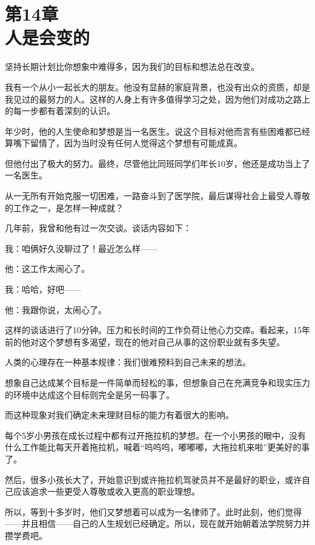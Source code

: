 
\section[第14章\q 人是会变的]{第14章\\ 人是会变的}

{\kaishu

坚持长期计划比你想象中难得多，因为我们的目标和想法总在改变。

}

我有一个从小一起长大的朋友。他没有显赫的家庭背景，也没有出众的资质，却是我见过的最努力的人。这样的人身上有许多值得学习之处，因为他们对成功之路上的每一步都有着深刻的认识。

年少时，他的人生使命和梦想是当一名医生。说这个目标对他而言有些困难都已经算嘴下留情了，因为当时没有任何人觉得这个梦想有可能成真。

但他付出了极大的努力。最终，尽管他比同班同学们年长10岁，他还是成功当上了一名医生。

从一无所有开始克服一切困难，一路奋斗到了医学院，最后谋得社会上最受人尊敬的工作之一，是怎样一种成就？

几年前，我曾和他有过一次交谈。谈话内容如下：

{\kaishu

我：咱俩好久没聊过了！最近怎么样——

他：这工作太闹心了。

我：哈哈，好吧——

他：我跟你说，太闹心了。

}

这样的谈话进行了10分钟。压力和长时间的工作负荷让他心力交瘁。看起来，15年前的他对这个梦想有多渴望，现在的他对自己从事的这份职业就有多失望。

人类的心理存在一种基本规律：我们很难预料到自己未来的想法。

想象自己达成某个目标是一件简单而轻松的事，但想象自己在充满竞争和现实压力的环境中达成这个目标则完全是另一码事了。

而这种现象对我们确定未来理财目标的能力有着很大的影响。

每个5岁小男孩在成长过程中都有过开拖拉机的梦想。在一个小男孩的眼中，没有什么工作能比每天开着拖拉机，喊着“呜呜呜，嘟嘟嘟，大拖拉机来啦”更美好的事了。

然后，很多小孩长大了，开始意识到或许拖拉机驾驶员并不是最好的职业，或许自己应该追求一些更受人尊敬或收入更高的职业理想。

所以，等到十多岁时，他们又梦想着可以成为一名律师了。此时此刻，他们觉得——并且相信——自己的人生规划已经确定。所以，现在就开始朝着法学院努力并攒学费吧。


